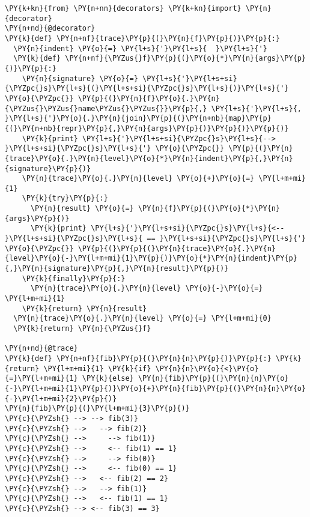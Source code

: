 \begin{Verbatim}[commandchars=\\\{\}]
\PY{k+kn}{from} \PY{n+nn}{decorators} \PY{k+kn}{import} \PY{n}{decorator}
\PY{n+nd}{@decorator}
\PY{k}{def} \PY{n+nf}{trace}\PY{p}{(}\PY{n}{f}\PY{p}{)}\PY{p}{:}
  \PY{n}{indent} \PY{o}{=} \PY{l+s}{'}\PY{l+s}{  }\PY{l+s}{'}
  \PY{k}{def} \PY{n+nf}{\PYZus{}f}\PY{p}{(}\PY{o}{*}\PY{n}{args}\PY{p}{)}\PY{p}{:}
    \PY{n}{signature} \PY{o}{=} \PY{l+s}{'}\PY{l+s+si}{\PYZpc{}s}\PY{l+s}{(}\PY{l+s+si}{\PYZpc{}s}\PY{l+s}{)}\PY{l+s}{'} \PY{o}{\PYZpc{}} \PY{p}{(}\PY{n}{f}\PY{o}{.}\PY{n}{\PYZus{}\PYZus{}name\PYZus{}\PYZus{}}\PY{p}{,} \PY{l+s}{'}\PY{l+s}{, }\PY{l+s}{'}\PY{o}{.}\PY{n}{join}\PY{p}{(}\PY{n+nb}{map}\PY{p}{(}\PY{n+nb}{repr}\PY{p}{,}\PY{n}{args}\PY{p}{)}\PY{p}{)}\PY{p}{)}
    \PY{k}{print} \PY{l+s}{'}\PY{l+s+si}{\PYZpc{}s}\PY{l+s}{--> }\PY{l+s+si}{\PYZpc{}s}\PY{l+s}{'} \PY{o}{\PYZpc{}} \PY{p}{(}\PY{n}{trace}\PY{o}{.}\PY{n}{level}\PY{o}{*}\PY{n}{indent}\PY{p}{,}\PY{n}{signature}\PY{p}{)}
    \PY{n}{trace}\PY{o}{.}\PY{n}{level} \PY{o}{+}\PY{o}{=} \PY{l+m+mi}{1}
    \PY{k}{try}\PY{p}{:}
      \PY{n}{result} \PY{o}{=} \PY{n}{f}\PY{p}{(}\PY{o}{*}\PY{n}{args}\PY{p}{)}
      \PY{k}{print} \PY{l+s}{'}\PY{l+s+si}{\PYZpc{}s}\PY{l+s}{<-- }\PY{l+s+si}{\PYZpc{}s}\PY{l+s}{ == }\PY{l+s+si}{\PYZpc{}s}\PY{l+s}{'} \PY{o}{\PYZpc{}} \PY{p}{(}\PY{p}{(}\PY{n}{trace}\PY{o}{.}\PY{n}{level}\PY{o}{-}\PY{l+m+mi}{1}\PY{p}{)}\PY{o}{*}\PY{n}{indent}\PY{p}{,}\PY{n}{signature}\PY{p}{,}\PY{n}{result}\PY{p}{)}
    \PY{k}{finally}\PY{p}{:}
      \PY{n}{trace}\PY{o}{.}\PY{n}{level} \PY{o}{-}\PY{o}{=} \PY{l+m+mi}{1}
    \PY{k}{return} \PY{n}{result}
  \PY{n}{trace}\PY{o}{.}\PY{n}{level} \PY{o}{=} \PY{l+m+mi}{0}
  \PY{k}{return} \PY{n}{\PYZus{}f}

\PY{n+nd}{@trace}
\PY{k}{def} \PY{n+nf}{fib}\PY{p}{(}\PY{n}{n}\PY{p}{)}\PY{p}{:} \PY{k}{return} \PY{l+m+mi}{1} \PY{k}{if} \PY{n}{n}\PY{o}{<}\PY{o}{=}\PY{l+m+mi}{1} \PY{k}{else} \PY{n}{fib}\PY{p}{(}\PY{n}{n}\PY{o}{-}\PY{l+m+mi}{1}\PY{p}{)}\PY{o}{+}\PY{n}{fib}\PY{p}{(}\PY{n}{n}\PY{o}{-}\PY{l+m+mi}{2}\PY{p}{)}
\PY{n}{fib}\PY{p}{(}\PY{l+m+mi}{3}\PY{p}{)}
\PY{c}{\PYZsh{} --> --> fib(3)}
\PY{c}{\PYZsh{} -->   --> fib(2)}
\PY{c}{\PYZsh{} -->     --> fib(1)}
\PY{c}{\PYZsh{} -->     <-- fib(1) == 1}
\PY{c}{\PYZsh{} -->     --> fib(0)}
\PY{c}{\PYZsh{} -->     <-- fib(0) == 1}
\PY{c}{\PYZsh{} -->   <-- fib(2) == 2}
\PY{c}{\PYZsh{} -->   --> fib(1)}
\PY{c}{\PYZsh{} -->   <-- fib(1) == 1}
\PY{c}{\PYZsh{} --> <-- fib(3) == 3}
\end{Verbatim}
